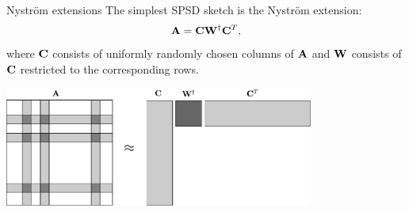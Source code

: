 \documentclass[xcolor=x11names,compress,ignorenonframetext,10pt]{beamer}
\renewcommand{\(}{\begin{columns}}
\renewcommand{\)}{\end{columns}}
\newcommand{\<}[1]{\begin{column}{#1}}
\renewcommand{\>}{\end{column}}
\def\refcolor{DodgerBlue4}
\newcommand{\refer}[1]{({\color{\refcolor}#1})}
\begin{document}
%   
% 
% 
% 
% 

\begin{frame}{Nystr\"om extensions}
 The simplest SPSD sketch is the Nystr\"om extension:
 \[ 
  \mathbf{A} = \mathbf{C} \mathbf{W}^\dagger \mathbf{C}^T,
 \]
 where $\mathbf{C}$ consists of uniformly randomly chosen columns of $\mathbf{A}$ and $\mathbf{W}$ consists of 
 $\mathbf{C}$ restricted to the corresponding rows.
 \centerline{\includegraphics[width=4in,keepaspectratio=true]{figures/spsd/nystrom-procedure}}
\end{frame}
\end{document}
